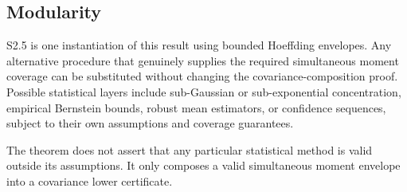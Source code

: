 \subsection{Modularity}

S2.5 is one instantiation of this result using bounded Hoeffding envelopes. Any alternative procedure that genuinely supplies the required simultaneous moment coverage can be substituted without changing the covariance-composition proof. Possible statistical layers include sub-Gaussian or sub-exponential concentration, empirical Bernstein bounds, robust mean estimators, or confidence sequences, subject to their own assumptions and coverage guarantees.

The theorem does not assert that any particular statistical method is valid outside its assumptions. It only composes a valid simultaneous moment envelope into a covariance lower certificate.
